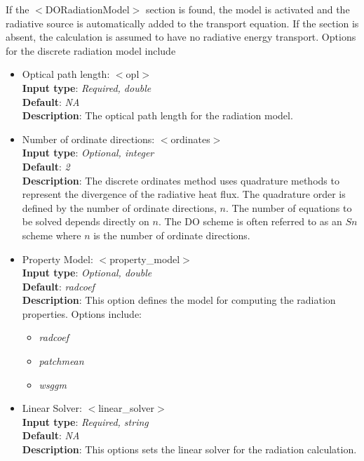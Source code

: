 \begin{enumerate}
If the $<$DORadiationModel$>$ section is found, the model is activated and the radiative source is automatically added to the transport equation.  If the section is absent, the calculation is assumed to have no radiative energy transport.  Options for the discrete radiation model include
\begin{itemize}
\item Optical path length: $<$opl$>$ \\
{\bf Input type}: {\it Required, double} \\
{\bf Default}: {\it NA } \\ 
{\bf Description}: The optical path length for the radiation model. 
\item Number of ordinate directions: $<$ordinates$>$ \\
{\bf Input type}: {\it Optional, integer} \\
{\bf Default}: {\it 2 } \\ 
{\bf Description}: The discrete ordinates method uses quadrature methods to represent the divergence of the radiative heat flux.  The quadrature order is defined by the number of ordinate directions, $n$.  The number of equations to be solved depends directly on $n$.  The DO scheme is often referred to as an $Sn$ scheme where $n$ is the number of ordinate directions.
%
\item Property Model: $<$property\_model$>$ \\
{\bf Input type}: {\it Optional, double} \\
{\bf Default}: {\it radcoef } \\ 
{\bf Description}:  This option defines the model for computing the radiation properties.  Options include:
\begin{itemize}
\item {\it radcoef} %
\item {\it patchmean}
\item {\it wsggm}
\end{itemize}
%
\item Linear Solver: $<$linear\_solver$>$ \\
{\bf Input type}: {\it Required, string} \\
{\bf Default}: {\it NA } \\
{\bf Description}: This options sets the linear solver for the radiation calculation.

\end{itemize}  

\end{enumerate}

